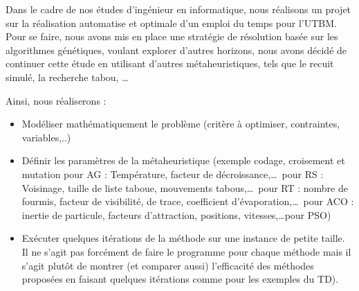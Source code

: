 

Dans le cadre de nos études d'ingénieur en informatique, nous réalisons un projet sur la réalisation automatise et optimale d'un emploi du temps pour l'\gls{UTBM}.
Pour se faire, nous avons mis en place une stratégie de résolution basée sur les algorithmes génétiques\cite{burke1994genetic}, voulant explorer d'autres horizons, nous avons décidé de continuer cette étude en utilisant d'autres métaheuristiques, tels que le recuit simulé, la recherche tabou, \ldots\

Ainsi, nous réaliserons :
\begin{itemize}
    \item Modéliser mathématiquement le problème (critère à optimiser, contraintes, variables,..)
    \item Définir les paramètres de la métaheuristique (exemple codage, croisement et mutation pour AG : Température, facteur de décroissance,\ldots\ pour RS : Voisinage, taille de liste taboue, mouvements tabous,\ldots\ pour RT : nombre de fourmis, facteur de visibilité, de trace, coefficient d'évaporation,\ldots\ pour ACO : inertie de particule, facteurs d'attraction, positions, vitesses,\ldots pour PSO)
    \item Exécuter quelques itérations de la méthode sur une instance de petite taille.
    Il ne s’agit pas forcément de faire le programme pour chaque méthode mais il s’agit plutôt de montrer (et comparer aussi) l'efficacité des méthodes proposées en faisant quelques itérations comme pour les exemples du TD).
\end{itemize}

